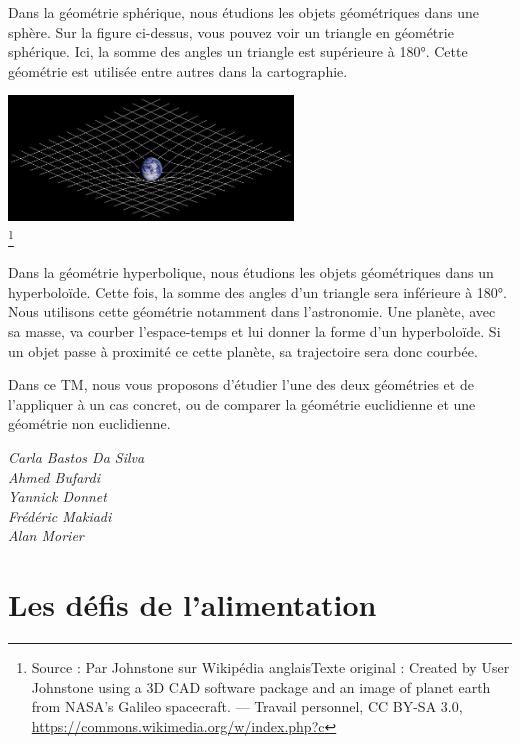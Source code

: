 \documentclass[
  10pt,
  french,
  a5paper,
  openany]{book}
\newenvironment{signature}{\begin{flushright}}{\end{flushright}}
\begin{document}
Dans la géométrie sphérique, nous étudions les objets géométriques dans une sphère. Sur la figure ci-dessus, vous pouvez voir un triangle en géométrie sphérique. Ici, la somme des angles un triangle est supérieure à 180°. Cette géométrie est utilisée entre autres dans la cartographie.

\begin{center}
\includegraphics[width=\textwidth,height=9em]{images/la-geometrie-non-euclidienne-3.jpg}\\
\footnote{Source : Par Johnstone sur Wikipédia anglaisTexte original : Created by User Johnstone using a 3D CAD software package and an image of planet earth from NASA's Galileo spacecraft. --- Travail personnel, CC BY-SA 3.0, \url{https://commons.wikimedia.org/w/index.php?c}}

\end{center}

Dans la géométrie hyperbolique, nous étudions les objets géométriques dans un hyperboloïde. Cette fois, la somme des angles d'un triangle sera inférieure à 180°. Nous utilisons cette géométrie notamment dans l'astronomie. Une planète, avec sa masse, va courber l'espace-temps et lui donner la forme d'un hyperboloïde. Si un objet passe à proximité ce cette planète, sa trajectoire sera donc courbée.

\clearpage

Dans ce TM, nous vous proposons d'étudier l'une des deux géométries et de l'appliquer à un cas concret, ou de comparer la géométrie euclidienne et une géométrie non euclidienne.

\begin{signature}
\emph{Carla Bastos Da Silva}\\
\emph{Ahmed Bufardi}\\
\emph{Yannick Donnet}\\
\emph{Frédéric Makiadi}\\
\emph{Alan Morier}

\end{signature}

\hypertarget{les-duxe9fis-de-lalimentation}{%
\chapter{Les défis de l'alimentation}\label{les-duxe9fis-de-lalimentation}}
\end{document}
